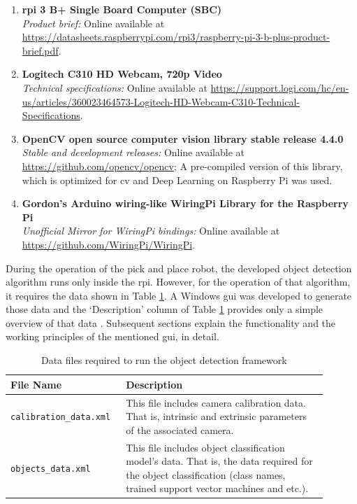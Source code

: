 \documentclass[a4paper,12pt]{report}
\begin{document}
\begin{enumerate}[1.]
	\item \textbf{\ac{rpi} 3 B+ Single Board Computer (SBC)}\\
	\textit{Product brief:} Online available at \url{https://datasheets.raspberrypi.com/rpi3/raspberry-pi-3-b-plus-product-brief.pdf}.
	
	\item \textbf{Logitech C310 HD Webcam, 720p Video}\\
	\textit{Technical specifications:} Online available at \url{https://support.logi.com/hc/en-us/articles/360023464573-Logitech-HD-Webcam-C310-Technical-Specifications}.
	
	\item \textbf{OpenCV open source computer vision library stable release 4.4.0}\cite{opencv_library} \\
	\textit{Stable and development releases:} Online available at \url{https://github.com/opencv/opencv}; A pre-compiled version of this library, which is optimized for \ac{cv} and Deep Learning on Raspberry Pi was used.
	
	\item \textbf{Gordon's Arduino wiring-like WiringPi Library for the Raspberry Pi}\cite{wiringpi} \\
	\textit{Unofficial Mirror for WiringPi bindings:} Online available at \url{https://github.com/WiringPi/WiringPi}.
	
\end{enumerate}


During the operation of the pick and place robot, the developed object detection algorithm runs only inside the \ac{rpi}. However, for the operation of that algorithm, it requires the data shown in Table \ref{table:datafiles}. A Windows \ac{gui} was developed to generate those data and the `Description' column of Table \ref{table:datafiles} provides only a simple overview of that data . Subsequent sections explain the functionality and the working principles of the mentioned \ac{gui}, in detail.\\

\begin{table}[h]
	\captionsetup{font=sc, labelsep=newline}
	\centering
	\caption{ Data files required to run the object detection framework}
	\begin{tabular}{|p{0.3\linewidth}  |p{0.6\linewidth}  |}
		\hline
		\textbf{File Name} & \textbf{Description}\\\hline
		{\tt calibration\_data.xml} & This file includes camera calibration data. That is, intrinsic and extrinsic parameters of the associated camera.\\ \hline
		{\tt objects\_data.xml} & This file includes object classification model's data. That is, the data required for the object classification (class names, trained support vector machines and etc.).\\
		\hline
	\end{tabular}
	\label{table:datafiles}
\end{table}
\end{document}
